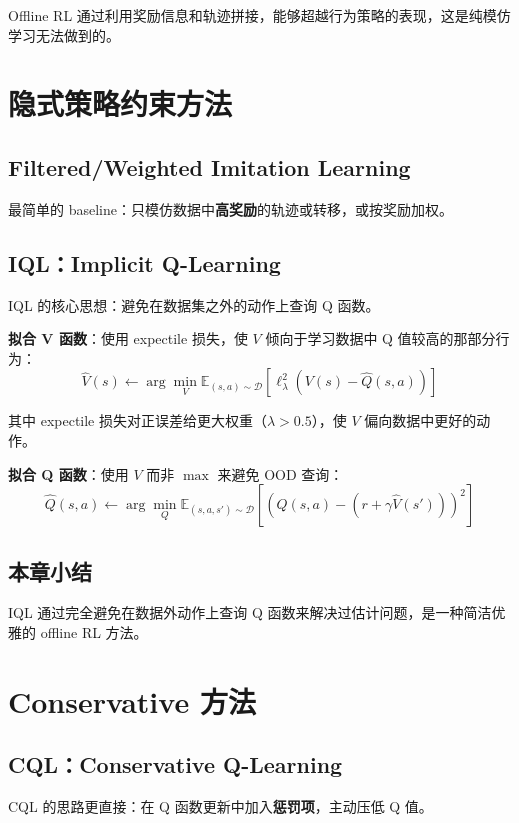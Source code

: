 \documentclass[a4paper]{article}
\begin{document}
Offline RL 通过利用奖励信息和轨迹拼接，能够超越行为策略的表现，这是纯模仿学习无法做到的。

\section{隐式策略约束方法}

\subsection{Filtered/Weighted Imitation Learning}

最简单的 baseline：只模仿数据中\textbf{高奖励}的轨迹或转移，或按奖励加权。

\subsection{IQL：Implicit Q-Learning}

IQL 的核心思想：避免在数据集之外的动作上查询 Q 函数。

\textbf{拟合 V 函数}：使用 expectile 损失，使 $V$ 倾向于学习数据中 Q 值较高的那部分行为：
$$\hat{V}(s) \leftarrow \arg\min_{V} \mathbb{E}_{(s,a) \sim \mathcal{D}} \left[\ell_\lambda^2\left(V(s) - \hat{Q}(s, a)\right)\right]$$

其中 expectile 损失对正误差给更大权重（$\lambda > 0.5$），使 $V$ 偏向数据中更好的动作。

\textbf{拟合 Q 函数}：使用 $V$ 而非 $\max$ 来避免 OOD 查询：
$$\hat{Q}(s, a) \leftarrow \arg\min_{Q} \mathbb{E}_{(s,a,s') \sim \mathcal{D}} \left[\left(Q(s,a) - (r + \gamma \hat{V}(s'))\right)^2\right]$$

\subsection{本章小结}

IQL 通过完全避免在数据外动作上查询 Q 函数来解决过估计问题，是一种简洁优雅的 offline RL 方法。

\section{Conservative 方法}

\subsection{CQL：Conservative Q-Learning}

CQL 的思路更直接：在 Q 函数更新中加入\textbf{惩罚项}，主动压低 Q 值。
\end{document}
